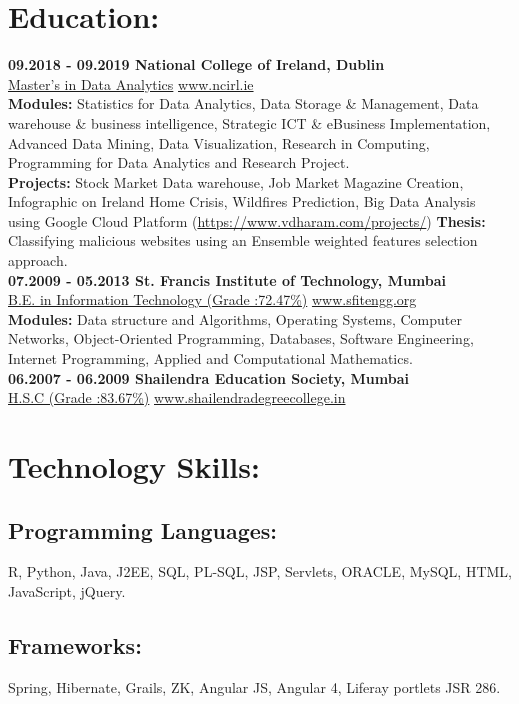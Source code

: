 \documentclass{article}
\begin{document}
\section{\faGraduationCap{} Education:}
\textbf{09.2018 - 09.2019 \hfill National College of Ireland, Dublin\\}
\underline{Master's in Data Analytics} \hfill \href{www.ncirl.ie}{www.ncirl.ie}\\
\textbf{Modules:} Statistics for Data Analytics, Data Storage \& Management, Data warehouse \& business intelligence, Strategic ICT \& eBusiness Implementation, Advanced Data Mining, Data Visualization, Research in Computing, Programming for Data Analytics and Research Project.\hfill\\
\textbf{Projects:} Stock Market Data warehouse, Job Market Magazine Creation, Infographic on Ireland Home Crisis, Wildfires Prediction, Big Data Analysis using Google Cloud Platform (\href{https://www.vdharam.com/projects/}{https://www.vdharam.com/projects/}) \hfill
\textbf{Thesis:} Classifying malicious websites using an Ensemble weighted
features selection approach. \hfill\\
\linebreak
\textbf{07.2009 - 05.2013 \hfill St. Francis Institute of Technology, Mumbai\\}
\underline{B.E. in Information Technology (Grade :72.47\%)} \hfill \href{www.sfitengg.org}{www.sfitengg.org} \\
\textbf{Modules:} Data structure and Algorithms, Operating Systems, Computer Networks, Object-Oriented Programming, Databases, Software Engineering, Internet Programming, Applied and Computational Mathematics.\hfill\\
\linebreak
\textbf{06.2007 - 06.2009 \hfill Shailendra Education Society, Mumbai \\}
\underline{H.S.C (Grade :83.67\%)} \hfill \href{www.shailendradegreecollege.in}{www.shailendradegreecollege.in}

\section{\faGears{} Technology Skills:}
\subsection{Programming Languages:}
R, Python, Java, J2EE, SQL, PL-SQL, JSP, Servlets, ORACLE, MySQL, HTML, JavaScript, jQuery.
\subsection{Frameworks:}
 Spring, Hibernate, Grails, ZK, Angular JS, Angular 4, Liferay portlets JSR 286.
\end{document}
